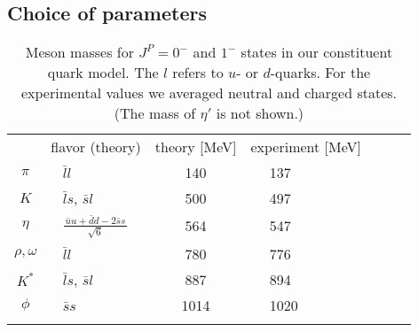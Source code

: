 \subsection{Choice of parameters}
\label{sec:choice_of_parameters}


\begin{table}[tb]
\caption{Meson masses for $J^{P}=0^{-}$ and $1^-$ states in our constituent quark model. The $l$ refers to $u$- or $d$-quarks. For the experimental values we averaged neutral and charged states. (The mass of $\eta'$ is not shown.)}
\label{tab:meson_mass}       %
\begin{tabular}{c lc lc lc |}
\hline\noalign{\smallskip}
  & flavor (theory) & theory [MeV] & experiment [MeV]  \\
\noalign{\smallskip}\hline\noalign{\smallskip}
$\pi$   &~ $\bar{l}l$                                                                           & 140     &~~ 137 \\
$K$    &~ $\bar{l}s$, $\bar{s}l$                                                         & 500     &~~ 497\\
$\eta$ &~ $ \frac{\, \bar{u}u + \bar{d}d - 2 \bar{s}s \,}{\, \sqrt{6} \,}$ & 564     &~~ 547 \\
\noalign{\smallskip}\hline\noalign{\smallskip}
$\rho, \omega$ &~ $\bar{l}l$                                                            & 780      &~~  776 \\
$K^*$ &~ $\bar{l}s$, $\bar{s}l$                                                        & 887      &~~  894 \\
$\phi$ &~ $\bar{s}s$                                                                        & 1014    &~~ 1020 \\
\noalign{\smallskip}\hline
\end{tabular}
\vspace*{0.0cm}  %
\end{table}
